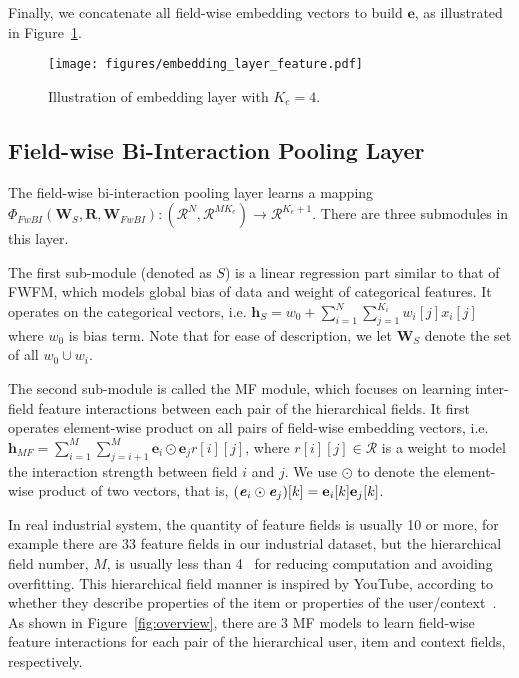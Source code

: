 \documentclass[sigconf]{acmart}
\newcommand{\Real}{\mathcal{R}}
\begin{document}
Finally, we concatenate all field-wise embedding vectors to build $\mathbf{e}$, as illustrated in Figure~\ref{fig:field_embedding}. 
\begin{figure}[htbp]
\centering\texttt{[image: figures/embedding\_layer\_feature.pdf]}
\caption{Illustration of embedding layer with $K_e=4$.}
\label{fig:field_embedding}
\end{figure} 

\subsection{Field-wise Bi-Interaction Pooling Layer}\label{sec:interaction}

The field-wise bi-interaction pooling layer learns a mapping \\ $\Phi_{FwBI}(\mathbf{W}_{S},\mathbf{R},\mathbf{W}_{FwBI}): (\Real^{N},\Real^{MK_e})\rightarrow \Real^{K_{e}+1}$. 
There are three submodules in this layer. 

The first sub-module (denoted as $S$) is a linear regression part similar to that of FWFM, which models global bias of data and weight of categorical features. It operates on the categorical vectors, i.e. $\mathbf{h}_S=w_0 + \sum_{i=1}^{N}\sum_{j=1}^{K_i} w_{i}[j] x_{i}[j]$ where $w_{0}$ is bias term. Note that for ease of description, we let $\mathbf{W}_{S}$ denote the set of all $w_0\cup w_{i}$.

The second sub-module is called the MF module, which focuses on learning inter-field feature interactions between each pair of the hierarchical fields. It first operates element-wise product on all pairs of field-wise embedding vectors, i.e.  $\mathbf{h}_{MF}= \sum_{i=1}^{M} \sum_{j=i+1}^{M}  \mathbf{e}_i\odot \mathbf{e}_j r[i][j]$, where $r[i][j] \in \Real$ is a weight to model the interaction strength between field $i$ and $j$. We use $\odot$ to denote the element-wise product of two vectors, that is, $(\textbf{\textit{e}}_i \odot \textbf{\textit{e}}_j)[k] = \mathbf{e}_{i}[k]\mathbf{e}_{j}[k]$. 

In real industrial system, the quantity of feature fields is usually 10 or more, for example there are 33 feature fields in our industrial dataset, but the hierarchical field number, $M$, is usually less than 4~\citep{liu2017pbodl,covington2016deep} for reducing computation and avoiding overfitting. This hierarchical field manner is inspired by YouTube, according to whether they describe properties of the item or properties of the user/context~\citep{covington2016deep}.
As shown in Figure~\ref{fig:overview}, there are 3 MF models to learn field-wise feature interactions for each pair of the hierarchical user, item and context fields, respectively.
\end{document}

